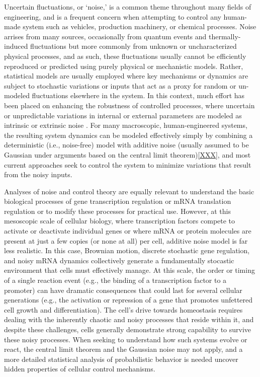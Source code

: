 \documentclass[12pt]{iopart}
\begin{document}
Uncertain fluctuations, or `noise,' is a common theme throughout many fields of engineering, and is a frequent concern when attempting to control any human-made system such as vehicles\cite{XXX}, production machinery\cite{XXX}, or chemical processes\cite{XXX}.
Noise arrises from many sources, occasionally from quantum events and thermally-induced fluctuations but more commonly from unknown or uncharacterized physical processes, and as such, these fluctuations usually cannot be efficiently reproduced or predicted using purely physical or mechanistic models.
Rather, statistical models are usually employed where key mechanisms or dynamics are subject to stochastic variations or inputs that act as a proxy for random or un-modeled fluctuations elsewhere in the system.
In this context, much effort has been placed on enhancing the robustness of controlled processes, where uncertain or unpredictable variations in internal or external parameters are modeled as intrinsic or extrinsic noise \cite{XXX}.
For many macroscopic, human-engineered systems, the resulting system dynamics can be modeled effectively simply by combining a deterministic (i.e., noise-free) model with additive noise (usually assumed to be Gaussian under arguments based on the central limit theorem)\ref{XXX}, and most current approaches seek to control the system to minimize variations that result from the noisy inputs. 

Analyses of noise and control theory are equally relevant to understand the basic biological processes of gene transcription regulation\cite{XXX} or mRNA translation regulation \cite{XXX} or to modify these processes for practical use\cite{XXX}.
However, at this mesoscopic scale of cellular biology, where transcription factors compete to activate or deactivate individual genes or where mRNA or protein molecules are present at just a few copies (or none at all) per cell, additive noise model is far less realistic.
In this case, Brownian motion, discrete stochastic gene regulation, and noisy mRNA dynamics collectively generate a fundamentally stocastic environment that cells must effectively manage. 
At this scale, the order or timing of a single reaction event (e.g., the binding of a transcription factor to a promoter) can have dramatic consequences that could last for several cellular generations (e.g., the activation or repression of a gene that promotes unfettered cell growth and differentiation). 
The cell's drive towards homeostasis requires dealing with the inherently chaotic and noisy processes that reside within it, and despite these challenges, cells generally demonstrate strong capability to survive these noisy processes. 
When seeking to understand how such systems evolve or react, the central limit theorem and the Gaussian noise may not apply, and a more detailed statistical analysis of probabilistic behavior is needed uncover hidden properties of cellular control mechanisms.
\end{document}
